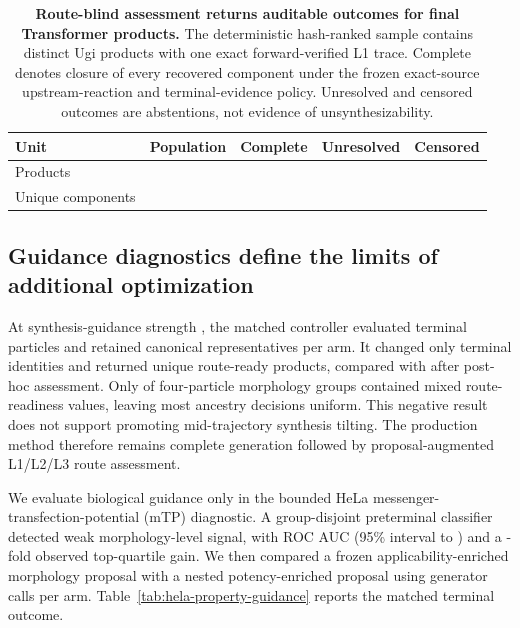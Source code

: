 \documentclass{article}
\begin{document}
\begin{table}[H]
\caption{\textbf{Route-blind assessment returns auditable outcomes for final Transformer products.}
The deterministic hash-ranked sample contains distinct Ugi products with one exact forward-verified
L1 trace. Complete denotes closure of every recovered component under the frozen exact-source
upstream-reaction and terminal-evidence policy. Unresolved and censored outcomes are abstentions,
not evidence of unsynthesizability.}
\label{tab:route-dispositions}
\centering
\small
\setlength{\tabcolsep}{5.5pt}
\begin{tabular}{lrrrr}
\toprule
Unit & Population & Complete & Unresolved & Censored \\
\midrule
Products & \ForgeRouteCandidates{} & \ForgeRouteCompleteProducts{} & \ForgeRouteUnresolvedProducts{} & \ForgeRouteCensoredProducts{} \\
Unique components & \ForgeRouteComponents{} & \ForgeRouteCompleteComponents{} & \ForgeRouteUnresolvedComponents{} & \ForgeRouteCensoredComponents{} \\
\bottomrule
\end{tabular}
\end{table}

\subsection{Guidance diagnostics define the limits of additional optimization}

At synthesis-guidance strength \ForgeSynthesisGuidanceStrength{}, the matched controller evaluated
\ForgeSynthesisTerminalParticles{} terminal particles and retained
\ForgeSynthesisCanonicalRepresentatives{} canonical representatives per arm. It changed only
\ForgeSynthesisChangedIdentities{} terminal identities and returned
\ForgeSynthesisGuidedReady{} unique route-ready products, compared with
\ForgeSynthesisPosthocReady{} after post-hoc assessment. Only
\ForgeProseGuidanceMixedGroups{} of \ForgeProseGuidanceTotalGroups{} four-particle morphology
groups contained mixed route-readiness values, leaving most ancestry decisions uniform. This
negative result does not support promoting mid-trajectory synthesis tilting. The production method
therefore remains complete generation followed by proposal-augmented L1/L2/L3 route assessment.

We evaluate biological guidance only in the bounded HeLa messenger-transfection-potential (mTP)
diagnostic. A group-disjoint preterminal classifier detected weak morphology-level signal, with ROC
AUC \ForgePotencyAUC{} (95\% interval \ForgePotencyAUCCILow{} to \ForgePotencyAUCCIHigh) and a
\ForgePotencyTopQuartileGain-fold observed top-quartile gain. We then compared a frozen
applicability-enriched morphology proposal with a nested potency-enriched proposal using
\ForgePotencyAttemptsPerArm{} generator calls per arm. Table~\ref{tab:hela-property-guidance}
reports the matched terminal outcome.
\end{document}
